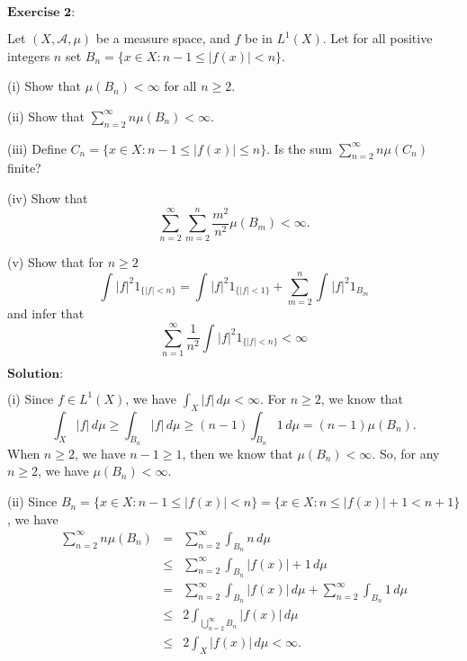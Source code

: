\documentclass[12pt]{article}
\begin{document}
\newpage

$\textbf{Exercise 2:}$

Let $(X, \mathcal{A}, \mu)$ be a measure space, and $f$ be in $L^{1}(X)$. Let for all positive integers $n$ set $B_{n} = \{x \in X: n-1 \leq |f(x)| < n \}$.

(i) Show that $\mu(B_{n}) < \infty$ for all $n \geq 2$.

(ii) Show that $\sum_{n=2}^{\infty} n \mu(B_{n}) < \infty$.

(iii) Define $C_{n} = \{x \in X : n-1 \leq |f(x)| \leq n \}$. Is the sum $\sum_{n=2}^{\infty} n \mu(C_{n})$ finite?

(iv) Show that $$\sum_{n=2}^{\infty} \sum_{m=2}^{n} \frac{m^{2}}{n^{2}} \mu(B_{m}) < \infty.$$

(v) Show that for $n \geq 2$
\begin{equation*}
    \int_{}^{} |f|^{2} 1_{\{|f| < n\}} = \int_{}^{} |f|^{2} 1_{\{|f| < 1\}} + \sum_{m=2}^{n} \int_{}^{} |f|^{2} 1_{B_{m}}
\end{equation*}
and infer that
\begin{equation*}
    \sum_{n=1}^{\infty} \frac{1}{n^{2}} \int_{}^{} |f|^{2} 1_{\{|f| < n\}} < \infty 
\end{equation*}
 
 
 
\vspace{8pt}
$\textbf{Solution:}$

(i) Since $f \in L^{1}(X)$, we have $\int_{X}^{} |f| \, d \mu < \infty$. For $n \geq 2$, we know that
\begin{equation*}
    \int_{X}^{} |f| \, d \mu \geq \int_{B_{n}}^{} |f| \, d \mu \geq (n-1) \int_{B_{n}}^{} 1 \, d \mu = (n-1) \mu(B_{n}).
\end{equation*}
When $n \geq 2$, we have $n-1 \geq 1$, then we know that $\mu(B_{n}) < \infty$.  So, for any $n \geq 2$, we have $\mu(B_{n}) < \infty$.

(ii) Since $B_{n} = \{ x \in X: n-1 \leq |f(x)| < n \} = \{x \in X: n \leq |f(x)|+1 < n+1 \}$, we have
\begin{eqnarray*}
    \sum_{n=2}^{\infty} n \mu(B_{n}) & = & \sum_{n=2}^{\infty} \int_{B_{n}}^{} n \, d \mu \\
& \leq & \sum_{n=2}^{\infty}  \int_{B_{n}}^{} |f(x)| + 1 \, d \mu \\
& = & \sum_{n=2}^{\infty}  \int_{B_{n}}^{} |f(x)| \, d \mu + \sum_{n=2}^{\infty}  \int_{B_{n}}^{} 1 \, d \mu \\ 
& \leq & 2 \int_{\bigcup_{n=2}^{\infty} B_{n}}^{} |f(x)| \, d \mu \\
& \leq & 2 \int_{X}^{} |f(x)| \, d \mu < \infty.
\end{eqnarray*}
\end{document}
